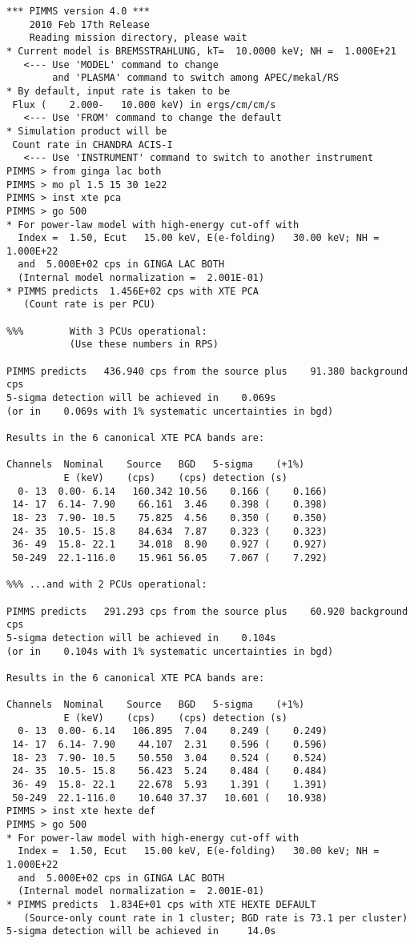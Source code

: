 \documentclass[11pt]{article}
\begin{document}
\begin{verbatim}
*** PIMMS version 4.0 ***
    2010 Feb 17th Release
    Reading mission directory, please wait
* Current model is BREMSSTRAHLUNG, kT=  10.0000 keV; NH =  1.000E+21
   <--- Use 'MODEL' command to change
        and 'PLASMA' command to switch among APEC/mekal/RS
* By default, input rate is taken to be
 Flux (    2.000-   10.000 keV) in ergs/cm/cm/s
   <--- Use 'FROM' command to change the default
* Simulation product will be
 Count rate in CHANDRA ACIS-I
   <--- Use 'INSTRUMENT' command to switch to another instrument
PIMMS > from ginga lac both
PIMMS > mo pl 1.5 15 30 1e22
PIMMS > inst xte pca
PIMMS > go 500
* For power-law model with high-energy cut-off with
  Index =  1.50, Ecut   15.00 keV, E(e-folding)   30.00 keV; NH =  1.000E+22
  and  5.000E+02 cps in GINGA LAC BOTH
  (Internal model normalization =  2.001E-01)
* PIMMS predicts  1.456E+02 cps with XTE PCA
   (Count rate is per PCU)

%%%        With 3 PCUs operational:
           (Use these numbers in RPS)

PIMMS predicts   436.940 cps from the source plus    91.380 background cps
5-sigma detection will be achieved in    0.069s
(or in    0.069s with 1% systematic uncertainties in bgd)

Results in the 6 canonical XTE PCA bands are:

Channels  Nominal    Source   BGD   5-sigma    (+1%)
          E (keV)    (cps)    (cps) detection (s)
  0- 13  0.00- 6.14   160.342 10.56    0.166 (    0.166)
 14- 17  6.14- 7.90    66.161  3.46    0.398 (    0.398)
 18- 23  7.90- 10.5    75.825  4.56    0.350 (    0.350)
 24- 35  10.5- 15.8    84.634  7.87    0.323 (    0.323)
 36- 49  15.8- 22.1    34.018  8.90    0.927 (    0.927)
 50-249  22.1-116.0    15.961 56.05    7.067 (    7.292)

%%% ...and with 2 PCUs operational:

PIMMS predicts   291.293 cps from the source plus    60.920 background cps
5-sigma detection will be achieved in    0.104s
(or in    0.104s with 1% systematic uncertainties in bgd)

Results in the 6 canonical XTE PCA bands are:

Channels  Nominal    Source   BGD   5-sigma    (+1%)
          E (keV)    (cps)    (cps) detection (s)
  0- 13  0.00- 6.14   106.895  7.04    0.249 (    0.249)
 14- 17  6.14- 7.90    44.107  2.31    0.596 (    0.596)
 18- 23  7.90- 10.5    50.550  3.04    0.524 (    0.524)
 24- 35  10.5- 15.8    56.423  5.24    0.484 (    0.484)
 36- 49  15.8- 22.1    22.678  5.93    1.391 (    1.391)
 50-249  22.1-116.0    10.640 37.37   10.601 (   10.938)
PIMMS > inst xte hexte def
PIMMS > go 500
* For power-law model with high-energy cut-off with
  Index =  1.50, Ecut   15.00 keV, E(e-folding)   30.00 keV; NH =  1.000E+22
  and  5.000E+02 cps in GINGA LAC BOTH
  (Internal model normalization =  2.001E-01)
* PIMMS predicts  1.834E+01 cps with XTE HEXTE DEFAULT
   (Source-only count rate in 1 cluster; BGD rate is 73.1 per cluster)
5-sigma detection will be achieved in     14.0s


\end{verbatim}
\end{document}
